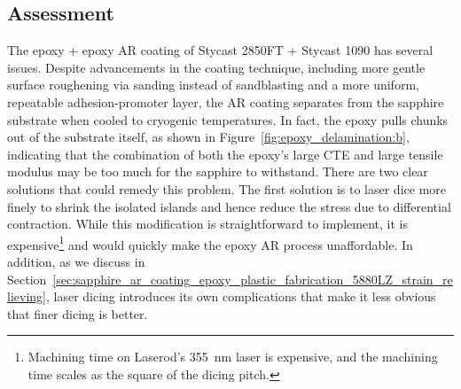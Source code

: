 
\subsection{Assessment}
\label{sec:sapphire_ar_coating_epoxy_assessment}

The epoxy + epoxy AR coating of Stycast 2850FT + Stycast 1090 has several issues. Despite advancements in the coating technique, including more gentle surface roughening via sanding instead of sandblasting and a more uniform, repeatable adhesion-promoter layer, the AR coating separates from the sapphire substrate when cooled to cryogenic temperatures. In fact, the epoxy pulls chunks out of the substrate itself, as shown in Figure~\ref{fig:epoxy_delamination:b}, indicating that the combination of both the epoxy's large CTE and large tensile modulus may be too much for the sapphire to withstand. There are two clear solutions that could remedy this problem. The first solution is to laser dice more finely to shrink the isolated islands and hence reduce the stress due to differential contraction. While this modification is straightforward to implement, it is expensive\footnote{Machining time on Laserod's 355~nm laser is expensive, and the machining time scales as the square of the dicing pitch.} and would quickly make the epoxy AR process unaffordable. In addition, as we discuss in Section~\ref{sec:sapphire_ar_coating_epoxy_plastic_fabrication_5880LZ_strain_relieving}, laser dicing introduces its own complications that make it less obvious that finer dicing is better.

